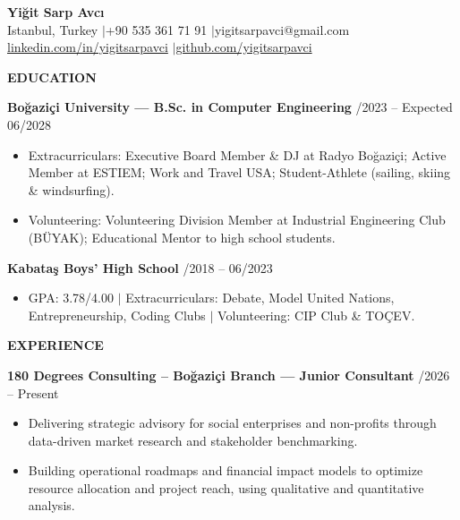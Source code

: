 \documentclass[a4paper]{article}
\newcommand{\sechead}[1]{%
    \vspace{3.8pt}%
    {\centering\fontsize{10.2}{12.2}\textbf{\MakeUppercase{#1}}\par}%
    \vspace{1.8pt}%
}
\newcommand{\entry}[2]{%
    {\fontsize{9.2}{11.5}\textbf{#1}} \hfill {\fontsize{8.4}{10.6}\selectfont #2} \par
}
\newcommand{\desc}[1]{%
    {\fontsize{8.0}{10.2}\selectfont #1}%
}
\begin{document}

{\centering
    {\fontsize{21}{24}\bfseries Yi\u{g}it Sarp Avc\i{}} \\[0.25em]
    {\fontsize{8.8}{11.2}\selectfont Istanbul, Turkey \enspace$\vert$\enspace +90 535 361 71 91 \enspace$\vert$\enspace yigitsarpavci@gmail.com} \\[0.18em]
    {\fontsize{8.8}{11.2}\selectfont \href{https://linkedin.com/in/yigitsarpavci}{linkedin.com/in/yigitsarpavci} \enspace$\vert$\enspace \href{https://github.com/yigitsarpavci}{github.com/yigitsarpavci}} \par
}
\vspace{0.12em}

\sechead{Education}

\entry{Bo\u{g}azi\c{c}i University \textnormal{--- B.Sc. in Computer Engineering}}{09/2023 -- Expected 06/2028}
\begin{itemize}[leftmargin=1.1em, itemsep=0.5pt, parsep=0pt, topsep=0.6pt]
    \item \desc{Extracurriculars: Executive Board Member \& DJ at Radyo Bo\u{g}azi\c{c}i; Active Member at ESTIEM; Work and Travel USA; Student-Athlete (sailing, skiing \& windsurfing).}
    \item \desc{Volunteering: Volunteering Division Member at Industrial Engineering Club (B\"{U}YAK); Educational Mentor to high school students.}
\end{itemize}
\vspace{1.5pt}

\entry{Kabata\c{s} Boys' High School}{09/2018 -- 06/2023}
\begin{itemize}[leftmargin=1.1em, itemsep=0.5pt, parsep=0pt, topsep=0.6pt]
    \item \desc{GPA: 3.78/4.00 $\vert$ Extracurriculars: Debate, Model United Nations, Entrepreneurship, Coding Clubs $\vert$ Volunteering: CIP Club \& TO\c{C}EV.}
\end{itemize}

\sechead{Experience}

\entry{180 Degrees Consulting -- Bo\u{g}azi\c{c}i Branch \textnormal{--- Junior Consultant}}{10/2026 -- Present}
\begin{itemize}[leftmargin=1.1em, itemsep=0.4pt, parsep=0pt, topsep=0.5pt]
   \item \desc{Delivering strategic advisory for social enterprises and non-profits through data-driven market research and stakeholder benchmarking.}
   \item \desc{Building operational roadmaps and financial impact models to optimize resource allocation and project reach, using qualitative and quantitative analysis.}
\end{itemize}
\vspace{1.5pt}
\end{document}
